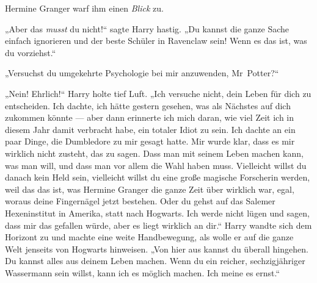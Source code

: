 Hermine Granger warf ihm einen \emph{Blick} zu.

„Aber das \emph{musst} du nicht!“ sagte Harry hastig.
„Du kannst die ganze Sache einfach ignorieren und der beste Schüler in Ravenclaw sein! Wenn es das ist, was du vorziehst.“

„Versuchst du umgekehrte Psychologie bei mir anzuwenden, Mr~Potter?“

„Nein! Ehrlich!“ Harry holte tief Luft.
„Ich versuche nicht, dein Leben für dich zu entscheiden. Ich dachte, ich hätte gestern gesehen, was als Nächstes auf dich zukommen könnte — aber dann erinnerte ich mich daran, wie viel Zeit ich in diesem Jahr damit verbracht habe, ein totaler Idiot zu sein. Ich dachte an ein paar Dinge, die Dumbledore zu mir gesagt hatte. Mir wurde klar, dass es mir wirklich nicht zusteht, das zu sagen. Dass man mit seinem Leben machen kann, was man will, und dass man vor allem die Wahl haben muss. Vielleicht willst du danach kein Held sein, vielleicht willst du eine große magische Forscherin werden, weil das das ist, was Hermine Granger die ganze Zeit über wirklich war, egal, woraus deine Fingernägel jetzt bestehen. Oder du gehst auf das Salemer Hexeninstitut in Amerika, statt nach Hogwarts. Ich werde nicht lügen und sagen, dass mir das gefallen würde, aber es liegt wirklich an dir.“ Harry wandte sich dem Horizont zu und machte eine weite Handbewegung, als wolle er auf die ganze Welt jenseits von Hogwarts hinweisen.
„Von hier aus kannst du überall hingehen. Du kannst alles aus deinem Leben machen. Wenn du ein reicher, sechzigjähriger Wassermann sein willst, kann ich es möglich machen. Ich meine es ernst.“


